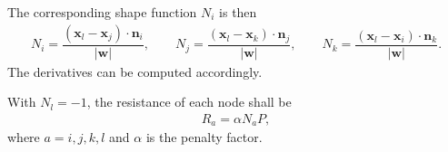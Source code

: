 \documentclass[10pt,fleqn,3p]{elsarticle}
\begin{document}
The corresponding shape function $N_i$ is then
\begin{gather*}
N_i=\dfrac{\left(\mathbold{x}_l-\mathbold{x}_j\right)\cdot\mathbold{n}_i}{|\mathbold{w}|},\qquad
N_j=\dfrac{\left(\mathbold{x}_l-\mathbold{x}_k\right)\cdot\mathbold{n}_j}{|\mathbold{w}|},\qquad
N_k=\dfrac{\left(\mathbold{x}_l-\mathbold{x}_i\right)\cdot\mathbold{n}_k}{|\mathbold{w}|}.
\end{gather*}
The derivatives can be computed accordingly.

With $N_l=-1$, the resistance of each node shall be
\begin{gather*}
R_a=\alpha{}N_aP,
\end{gather*}
where $a=i,j,k,l$ and $\alpha$ is the penalty factor.
\end{document}
